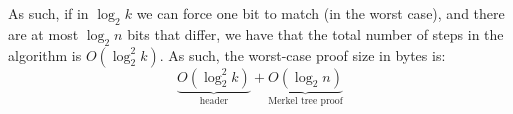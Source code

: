\documentclass[12pt]{exam}
\begin{document}
\begin{questions}
\begin{solution}
\begin{enumerate}[label=\textbf{\alph*.}]
    As such, if in $\log_2 k$ we can force one bit to match (in the worst case), and there are at most $\log_2 n$ bits that differ, we have that the total number of steps in the algorithm is $O(\log_2^2 k)$. As such, the worst-case proof size in bytes is:
    \[
      \underbrace{O(\log_2^2 k)}_{\text{header}} + \underbrace{O(\log_2 n)}_{\text{Merkel tree proof}}
    \]
\end{enumerate}
\end{solution}

\end{questions}
\end{document}

